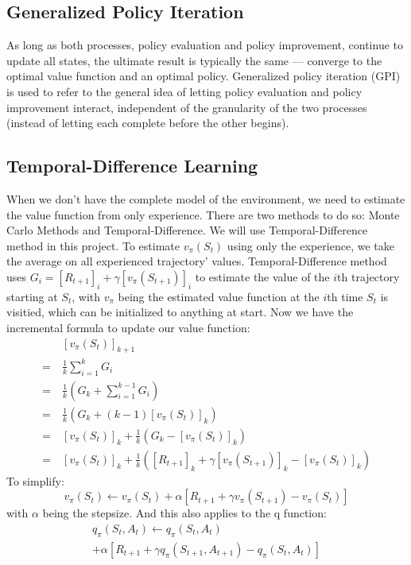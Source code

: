 \documentclass[balance,upint,subscriptcorrection,varvw,mathalfa=cal=boondoxo,pdf-a,nofoot]{asmeconf}
\begin{document}
\subsection{Generalized Policy Iteration~\cite{Sutton1998}}
\noindent As long as both processes, policy evaluation and policy improvement,
continue to update all states, the ultimate result is typically the 
same --- converge to the optimal value function and an optimal policy.
\vspace{3mm}\newline Generalized policy iteration (GPI) is used to refer to the
general idea of letting policy evaluation and policy improvement interact,
independent of the granularity of the two processes (instead of letting each
complete before the other begins).

\subsection{Temporal-Difference Learning}
\noindent When we don't have the complete model of the environment, we need to 
estimate the value function from only experience. There are two methods to do 
so: Monte Carlo Methods and Temporal-Difference. We will use 
Temporal-Difference method in this project.
\vspace{3mm}\newline To estimate \(v_\pi(S_t)\) using only the experience, we 
take the average on all experienced trajectory' values. Temporal-Difference
method uses \(G_i = [R_{t+1}]_i+\gamma [v_\pi(S_{t+1})]_i\) to estimate the 
value of the \(i\)th trajectory starting at \(S_t\), with \(v_\pi\) being the 
estimated value function at the \(i\)th time \(S_t\) is visitied, which can be 
initialized to anything at start. Now we have the incremental formula to update
our value function:
\begin{align*}
    &[v_\pi(S_t)]_{k+1} \\
    =\:& \frac{1}{k}\sum_{i=1}^{k} G_i\\
    =\:& \frac{1}{k}\left(G_k + \sum_{i=1}^{k-1} G_i\right)\\
    =\:& \frac{1}{k}\left(G_k + (k-1)[v_\pi(S_t)]_{k}\right)\\
    =\:& [v_\pi(S_t)]_k + \frac{1}{k}(G_k-[v_\pi(S_t)]_k)\\
    =\:& [v_\pi(S_t)]_k + \frac{1}{k}
    ([R_{t+1}]_k+\gamma [v_\pi(S_{t+1})]_k-[v_\pi(S_t)]_k)
\end{align*}
To simplify:
\[v_\pi(S_t)\longleftarrow v_\pi(S_t)+\alpha
[R_{t+1}+\gamma v_\pi(S_{t+1})-v_\pi(S_t)]\]
with \(\alpha\) being the stepsize. And this also applies to the q function:
\begin{multline*}
    q_\pi(S_t, A_t)\longleftarrow q_\pi(S_t, A_t)\\
    +\alpha[R_{t+1}+\gamma q_\pi(S_{t+1}, A_{t+1})-q_\pi(S_t, A_t)]
\end{multline*}
\end{document}
